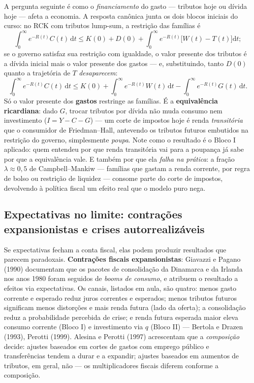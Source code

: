 \documentclass[12pt, a4paper]{article}
\newcommand{\dif}{\mathrm{d}}
\begin{document}
A pergunta seguinte é como o \emph{financiamento} do gasto --- tributos hoje
ou dívida hoje --- afeta a economia. A resposta canônica junta os dois blocos
iniciais do curso: no RCK com tributos lump-sum, a restrição das famílias é
\[
\int_{0}^{\infty} e^{-R(t)} C(t)\,\dif t \leq K(0) + D(0)
+ \int_{0}^{\infty} e^{-R(t)}\bigl[W(t) - T(t)\bigr]\dif t;
\]
se o governo satisfaz sua restrição com igualdade, o valor presente dos
tributos é a dívida inicial mais o valor presente dos gastos --- e,
substituindo, tanto $D(0)$ quanto a trajetória de $T$ \emph{desaparecem}:
\[
\int_{0}^{\infty} e^{-R(t)} C(t)\,\dif t \leq K(0)
+ \int_{0}^{\infty} e^{-R(t)} W(t)\,\dif t
- \int_{0}^{\infty} e^{-R(t)} G(t)\,\dif t.
\]
Só o valor presente dos \textbf{gastos} restringe as famílias. É a
\textbf{equivalência ricardiana}: dado $G$, trocar tributos por dívida não
muda consumo nem investimento ($I = Y - C - G$) --- um corte de impostos hoje
é renda \emph{transitória} que o consumidor de Friedman--Hall, antevendo os
tributos futuros embutidos na restrição do governo, simplesmente \emph{poupa}.
Note como o resultado é o Bloco I aplicado: quem entendeu por que renda
transitória vai para a poupança já sabe por que a equivalência vale. E também
por que ela \emph{falha na prática}: a fração $\lambda \approx 0{,}5$ de
Campbell--Mankiw --- famílias que gastam a renda corrente, por regra de bolso
ou restrição de liquidez --- consome parte do corte de impostos, devolvendo à
política fiscal um efeito real que o modelo puro nega.

\subsection{Expectativas no limite: contrações expansionistas e crises autorrealizáveis}

Se expectativas fecham a conta fiscal, elas podem produzir resultados que
parecem paradoxais. \textbf{Contrações fiscais expansionistas}: Giavazzi e
Pagano (1990) documentam que os pacotes de consolidação da Dinamarca e da
Irlanda nos anos 1980 foram seguidos de \emph{booms de consumo}, e atribuem o
resultado a efeitos via expectativas. Os canais, listados em aula, são quatro:
menos gasto corrente e esperado reduz juros correntes e esperados; menos
tributos futuros significam menos distorções e mais renda futura (lado da
oferta); a consolidação reduz a probabilidade percebida de crise; e renda
futura esperada maior eleva consumo corrente (Bloco I) e investimento via $q$
(Bloco II) --- Bertola e Drazen (1993), Perotti (1999). Alesina e Perotti
(1997) acrescentam que a \emph{composição} decide: ajustes baseados em cortes
de gastos com emprego público e transferências tendem a durar e a expandir;
ajustes baseados em aumentos de tributos, em geral, não --- os multiplicadores
fiscais diferem conforme a composição.
\end{document}
